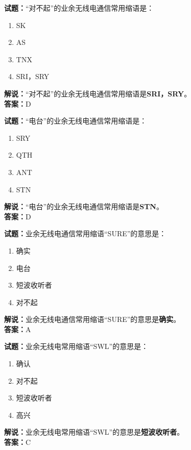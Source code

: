 \documentclass{ctexbook}
\begin{document}
\bigskip


\noindent\textbf{试题：}“对不起”的业余无线电通信常用缩语是：
\begin{enumerate}[leftmargin=3em]
\item SK
\item AS
\item TNX
\item SRI，SRY
\end{enumerate}
\noindent\textbf{解说：}“对不起”的业余无线电通信常用缩语是\textbf{SRI，SRY}。\\\noindent\textbf{答案：}D



\bigskip


\noindent\textbf{试题：}“电台”的业余无线电通信常用缩语是：
\begin{enumerate}[leftmargin=3em]
\item SRY
\item QTH
\item ANT
\item STN
\end{enumerate}
\noindent\textbf{解说：}“电台”的业余无线电通信常用缩语是\textbf{STN}。\\\noindent\textbf{答案：}D



\bigskip


\noindent\textbf{试题：}业余无线电通信常用缩语“SURE”的意思是：
\begin{enumerate}[leftmargin=3em]
\item 确实
\item 电台
\item 短波收听者
\item 对不起
\end{enumerate}
\noindent\textbf{解说：}业余无线电通信常用缩语“SURE”的意思是\textbf{确实}。\\\noindent\textbf{答案：}A


\bigskip


\noindent\textbf{试题：}业余无线电常用缩语“SWL”的意思是：
\begin{enumerate}[leftmargin=3em]
\item 确认
\item 对不起
\item 短波收听者
\item 高兴
\end{enumerate}
\noindent\textbf{解说：}业余无线电常用缩语“SWL”的意思是\textbf{短波收听者}。\\\noindent\textbf{答案：}C
\end{document}
